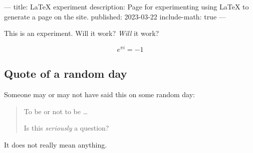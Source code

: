 ---
title: LaTeX experiment
description: Page for experimenting using LaTeX to generate a page on the site.
published: 2023-03-22
include-math: true
---

This is an experiment.  Will it work?  \emph{Will} it work?

\[ e^{\pi i} = -1 \]

\subsection{Quote of a random day}

Someone may or may not have said this on some random day:

\begin{quote}
  To be or not to be \ldots

  Is this \emph{seriously} a question?
\end{quote}

It does not really mean anything.
